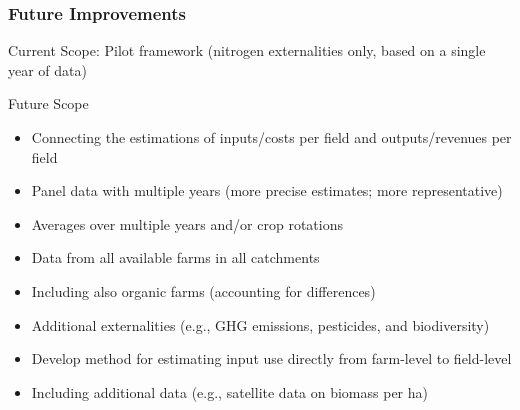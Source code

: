 \documentclass[t,24pt,aspectratio=169]{beamer}
\begin{document}
\begin{frame}[hvid]
\frametitle{\vspace{-3ex}  Future Improvements}

\vspace{-1ex}
Current Scope: Pilot framework
(nitrogen externalities only,
based on a single year of data)
\vspace{1ex}

Future Scope
\begin{itemize}
\setlength{\itemsep}{1ex}
\item Connecting the estimations of inputs/costs per field and outputs/revenues per field%

\item Panel data with multiple years 
(more precise estimates; more representative)  %

\item Averages over multiple years and/or crop rotations

\item Data from all available farms in all catchments

\item Including also organic farms (accounting for differences)

\item Additional externalities (e.g., GHG emissions, pesticides, and biodiversity)

\item Develop method for estimating input use directly from farm-level to field-level 

\item Including additional data (e.g., satellite data on biomass per ha)
\end{itemize}
\end{frame}
\end{document}
